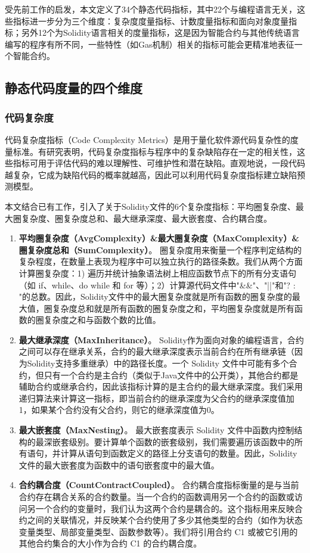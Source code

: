 受先前工作\cite{halstead,mccabe,menzies2007data}的启发，本文定义了34个静态代码指标，其中22个与编程语言无关，这些指标进一步分为三个维度：复杂度度量指标、计数度量指标和面向对象度量指标；另外12个为Solidity语言相关的度量指标，这是因为智能合约与其他传统语言编写的程序有所不同，一些特性（如Gas机制）相关的指标可能会更精准地表征一个智能合约。

\subsection{静态代码度量的四个维度}
\subsubsection{代码复杂度}

代码复杂度指标（Code Complexity Metrics）是用于量化软件源代码复杂性的度量标准。有研究表明\cite{Chen2019AnEI,singh2015bug}，代码复杂度指标与程序中的复杂缺陷存在一定的相关性，这些指标可用于评估代码的难以理解性、可维护性和潜在缺陷。直观地说，一段代码越复杂，它成为缺陷代码的概率就越高，因此可以利用代码复杂度指标建立缺陷预测模型。

本文结合已有工作，引入了关于Solidity文件的6个复杂度指标：平均圈复杂度、最大圈复杂度、圈复杂度总和、最大继承深度、最大嵌套度、合约耦合度。
\begin{enumerate}[label=\Alph*., align=left, leftmargin=*]
    \item \textbf{平均圈复杂度（AvgComplexity）\&最大圈复杂度（MaxComplexity）\&圈复杂度总和（SumComplexity）}。
    圈复杂度用来衡量一个程序判定结构的复杂程度，在数量上表现为程序中可以独立执行的路径条数。我们从两个方面计算圈复杂度：1) 遍历并统计抽象语法树上相应函数节点下的所有分支语句（如 if、while、do while 和 for 等）；2）计算源代码文件中"\&\&"、"||"和"? : "的总数。因此，Solidity文件中的最大圈复杂度就是所有函数的圈复杂度的最大值，圈复杂度总和就是所有函数的圈复杂度之和，平均圈复杂度就是所有函数的圈复杂度之和与函数个数的比值。
    \item \textbf{最大继承深度（MaxInheritance）}。
    Solidity作为面向对象的编程语言，合约之间可以存在继承关系，合约的最大继承深度表示当前合约在所有继承链（因为Solidity支持多重继承）中的路径长度。一个 Solidity 文件中可能有多个合约，但只有一个合约是主合约（类似于Java文件中的公开类），其他合约都是辅助合约或继承合约，因此该指标计算的是主合约的最大继承深度。我们采用递归算法来计算这一指标，即当前合约的继承深度为父合约的继承深度值加1，如果某个合约没有父合约，则它的继承深度值为0。
    \item \textbf{最大嵌套度（MaxNesting）}。
    最大嵌套度表示 Solidity 文件中函数内控制结构的最深嵌套级别。要计算单个函数的嵌套级别，我们需要遍历该函数中的所有语句，并计算从语句到函数定义的路径上分支语句的数量。因此，Solidity 文件的最大嵌套度为函数中的语句嵌套度中的最大值。
    \item \textbf{合约耦合度（CountContractCoupled）}。
    合约耦合度指标衡量的是与当前合约存在耦合关系的合约数量。当一个合约的函数调用另一个合约的函数或访问另一个合约的变量时，我们认为这两个合约是耦合的。这个指标用来反映合约之间的关联情况，并反映某个合约使用了多少其他类型的合约（如作为状态变量类型、局部变量类型、函数参数等）。我们将引用合约 C1 或被它引用的其他合约集合的大小作为合约 C1 的合约耦合度。
\end{enumerate}
